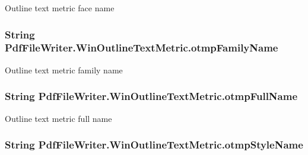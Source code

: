 Outline text metric face name 

\subsubsection[{\texorpdfstring{otmp\+Family\+Name}{otmpFamilyName}}]{\setlength{\rightskip}{0pt plus 5cm}String Pdf\+File\+Writer.\+Win\+Outline\+Text\+Metric.\+otmp\+Family\+Name\hspace{0.3cm}{\ttfamily [get]}}\hypertarget{class_pdf_file_writer_1_1_win_outline_text_metric_a128c2b3f87be49d983371628a9984524}{}\label{class_pdf_file_writer_1_1_win_outline_text_metric_a128c2b3f87be49d983371628a9984524}


Outline text metric family name 

\subsubsection[{\texorpdfstring{otmp\+Full\+Name}{otmpFullName}}]{\setlength{\rightskip}{0pt plus 5cm}String Pdf\+File\+Writer.\+Win\+Outline\+Text\+Metric.\+otmp\+Full\+Name\hspace{0.3cm}{\ttfamily [get]}}\hypertarget{class_pdf_file_writer_1_1_win_outline_text_metric_a5dde87b0c4c11e568f9f69bd38a450d6}{}\label{class_pdf_file_writer_1_1_win_outline_text_metric_a5dde87b0c4c11e568f9f69bd38a450d6}


Outline text metric full name 

\subsubsection[{\texorpdfstring{otmp\+Style\+Name}{otmpStyleName}}]{\setlength{\rightskip}{0pt plus 5cm}String Pdf\+File\+Writer.\+Win\+Outline\+Text\+Metric.\+otmp\+Style\+Name\hspace{0.3cm}{\ttfamily [get]}}\hypertarget{class_pdf_file_writer_1_1_win_outline_text_metric_a98fcf85a2ce32011eca6459eca702aa8}{}\label{class_pdf_file_writer_1_1_win_outline_text_metric_a98fcf85a2ce32011eca6459eca702aa8}


